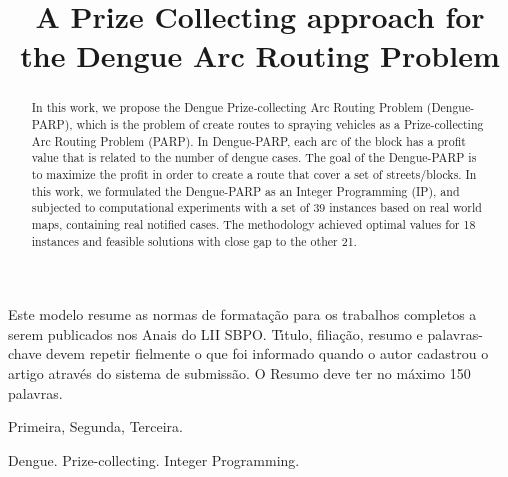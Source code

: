 \documentclass[a4paper,11pt]{article}
\begin{document}
\title{A Prize Collecting approach for the Dengue Arc Routing Problem} 

\maketitle
\thispagestyle{fancy}

\author{
}

\author{ 
}

\vspace{8mm}
\begin{resumo}
Este modelo resume as normas de formata\c c\~ao para os trabalhos completos a serem publicados
nos Anais do LII SBPO. T\'\i tulo, filia\c c\~ao, resumo e palavras-chave devem repetir fielmente
o que foi informado quando o autor cadastrou o artigo atrav\' es do sistema de submiss\~ao.
O Resumo deve ter no m\' aximo 150 palavras.
 \end{resumo}

\bigskip
\begin{palchaves}
Primeira, Segunda, Terceira.

\bigskip
{}
\end{palchaves}


\vspace{8mm}

\begin{abstract}
In this work, we propose the Dengue Prize-collecting Arc Routing Problem (Dengue-PARP), which is the problem of create routes to spraying vehicles as
a Prize-collecting Arc Routing Problem (PARP). In Dengue-PARP, each arc of the block has a profit value that is related to the number of dengue cases. The goal of the Dengue-PARP is to maximize the profit in order to create a route that cover a set of streets/blocks. In this work, we formulated the
Dengue-PARP as an Integer Programming (IP), and subjected to computational experiments with a set of 39 instances based on real world maps, containing real notified cases. The methodology achieved optimal values for 18 instances and feasible solutions with close gap to the other 21.
\end{abstract}

\bigskip
\begin{keywords}
Dengue. Prize-collecting. Integer Programming.

\bigskip
\end{keywords}
\end{document}
